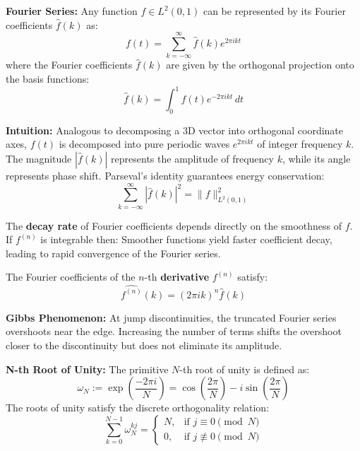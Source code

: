 \begin{definition}
    \textbf{Fourier Series:} Any function $f \in L^2(0,1)$ can be represented by its Fourier coefficients $\hat{f}(k)$ as:
    $$f(t) = \sum_{k=-\infty}^{\infty} \hat{f}(k) e^{2\pi i k t}$$
    where the Fourier coefficients $\hat{f}(k)$ are given by the orthogonal projection onto the basis functions:
    $$\hat{f}(k) = \int_0^1 f(t) e^{-2\pi i k t} \, dt$$
\end{definition}

\begin{remark}
    \textbf{Intuition:} Analogous to decomposing a 3D vector into orthogonal coordinate axes, $f(t)$ is decomposed into pure periodic waves $e^{2\pi i k t}$ of integer frequency $k$. The magnitude $|\hat{f}(k)|$ represents the amplitude of frequency $k$, while its angle represents phase shift. Parseval's identity guarantees energy conservation:
    $$\sum_{k=-\infty}^{\infty} |\hat{f}(k)|^2 = \|f\|_{L^2(0,1)}^2$$
\end{remark}

\begin{remark}
    The \textbf{decay rate} of Fourier coefficients depends directly on the smoothness of $f$. If $f^{(n)}$ is integrable then:
    Smoother functions yield faster coefficient decay, leading to rapid convergence of the Fourier series.
\end{remark}

\begin{remark}
    The Fourier coefficients of the $n$-th \textbf{derivative} $f^{(n)}$ satisfy:
    $$\widehat{f^{(n)}}(k) = (2\pi i k)^n \hat{f}(k)$$
\end{remark}

\begin{remark}
    \textbf{Gibbs Phenomenon:} At jump discontinuities, the truncated Fourier series overshoots near the edge. Increasing the number of terms shifts the overshoot closer to the discontinuity but does not eliminate its amplitude.
\end{remark}

\begin{definition}
    \textbf{N-th Root of Unity:} The primitive $N$-th root of unity is defined as:
    $$\omega_N := \exp\left(\frac{-2\pi i}{N}\right) = \cos\left(\frac{2\pi}{N}\right) - i \sin\left(\frac{2\pi}{N}\right)$$
    The roots of unity satisfy the discrete orthogonality relation:
    $$\sum_{k=0}^{N-1} \omega_N^{kj} = \begin{cases} N, & \text{if } j \equiv 0 \pmod N \\ 0, & \text{if } j \not\equiv 0 \pmod N \end{cases}$$
\end{definition}

